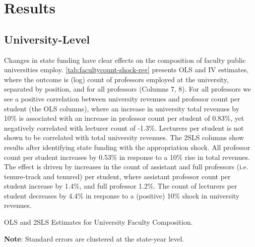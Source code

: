\section{Results}
\label{sec:results}

\subsection{University-Level}

Changes in state funding have clear effects on the composition of faculty public universities employ.
\autoref{tab:facultycount-shock-reg} presents OLS and IV estimates, where the outcome is (log) count of professors employed at the university, separated by position, and for all professors (Columns 7, 8).
For all professors we see a positive correlation between university revenues and professor count per student (the OLS columns), where an increase in university total revenues by 10\% is associated with an increase in professor count per student of 0.83\%, yet negatively correlated with lecturer count of -1.3\%.
Lecturers per student is not shown to be correlated with total university revenues.
The 2SLS columns show results after identifying state funding with the appropriation shock.
All professor count per student increases by 0.53\% in response to a 10\% rise in total revenues.
The effect is driven by increases in the count of assistant and full professors (i.e. tenure-track and tenured) per student, where assistant professor count per student increase by 1.4\%, and full professor 1.2\%.
The count of lecturers per student decreases by 4.4\% in response to a (positive) 10\% shock in university revenues.

\begin{table}[h!]
    \singlespacing
    \centering
    \caption{OLS and 2SLS Estimates for University Faculty Composition.}
    \makebox[\textwidth][c]{}
    \begin{flushleft}
        \footnotesize
        \textbf{Note}: Standard errors are clustered at the state-year level.
    \end{flushleft}
    \label{tab:facultycount-shock-reg}
\end{table}

